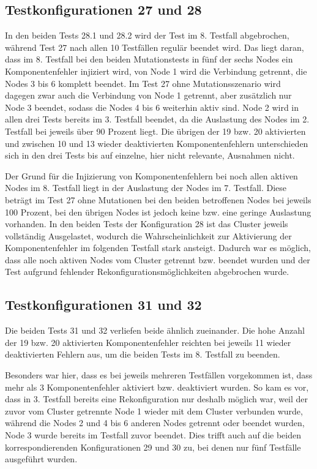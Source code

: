 \subsection{Testkonfigurationen 27 und 28}
\label{sec:noReconf2728}

In den beiden Tests 28.1 und 28.2 wird der Test im 8. Testfall abgebrochen, während Test 27 nach allen 10 Testfällen regulär beendet wird.
Das liegt daran, dass im 8. Testfall bei den beiden Mutationstests in fünf der sechs Nodes ein Komponentenfehler injiziert wird, von Node 1 wird die Verbindung getrennt, die Nodes 3 bis 6 komplett beendet.
Im Test 27 ohne Mutationsszenario wird dagegen zwar auch die Verbindung von Node 1 getrennt, aber zusätzlich nur Node 3 beendet, sodass die Nodes 4 bis 6 weiterhin aktiv sind.
Node 2 wird in allen drei Tests bereits im 3. Testfall beendet, da die Auslastung des Nodes im 2. Testfall bei jeweils über 90 Prozent liegt.
Die übrigen der 19 bzw. 20 aktivierten und zwischen 10 und 13 wieder deaktivierten Komponentenfehlern unterschieden sich in den drei Tests bis auf einzelne, hier nicht relevante, Ausnahmen nicht.

Der Grund für die Injizierung von Komponentenfehlern bei noch allen aktiven Nodes im 8. Testfall liegt in der Auslastung der Nodes im 7. Testfall.
Diese beträgt im Test 27 ohne Mutationen bei den beiden betroffenen Nodes bei jeweils 100 Prozent, bei den übrigen Nodes ist jedoch keine bzw. eine geringe Auslastung vorhanden.
In den beiden Tests der Konfiguration 28 ist das Cluster jeweils vollständig Ausgelastet, wodurch die Wahrscheinlichkeit zur Aktivierung der Komponentenfehler im folgenden Testfall stark ansteigt.
Dadurch war es möglich, dass alle noch aktiven Nodes vom Cluster getrennt bzw. beendet wurden und der Test aufgrund fehlender Rekonfigurationsmöglichkeiten abgebrochen wurde.

\subsection{Testkonfigurationen 31 und 32}
\label{sec:noReconf3132}

Die beiden Tests 31 und 32 verliefen beide ähnlich zueinander.
Die hohe Anzahl der 19 bzw. 20 aktivierten Komponentenfehler reichten bei jeweils 11 wieder deaktivierten Fehlern aus, um die beiden Tests im 8. Testfall zu beenden.

Besonders war hier, dass es bei jeweils mehreren Testfällen vorgekommen ist, dass mehr als 3 Komponentenfehler aktiviert bzw. deaktiviert wurden.
So kam es vor, dass \zB in 3. Testfall bereits eine Rekonfiguration nur deshalb möglich war, weil der zuvor vom Cluster getrennte Node 1 wieder mit dem Cluster verbunden wurde, während die Nodes 2 und 4 bis 6 anderen Nodes getrennt oder beendet wurden, Node 3 wurde bereits im Testfall zuvor beendet.
Dies trifft auch auf die beiden korrespondierenden Konfigurationen 29 und 30 zu, bei denen nur fünf Testfälle ausgeführt wurden.


